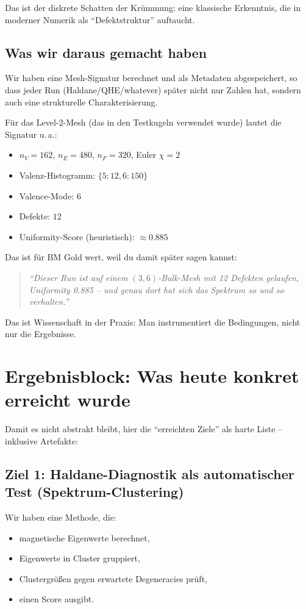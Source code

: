 \documentclass[11pt,a4paper]{article}
\begin{document}
Das ist der diskrete Schatten der Krümmung: eine klassische Erkenntnis, die in moderner Numerik als ``Defektstruktur'' auftaucht.

\subsection{Was wir daraus gemacht haben}

Wir haben eine Mesh-Signatur berechnet und als Metadaten abgespeichert, so dass jeder Run (Haldane/QHE/whatever) später nicht nur Zahlen hat, sondern auch eine strukturelle Charakterisierung.

Für das Level-2-Mesh (das in den Testkugeln verwendet wurde) lautet die Signatur u.\,a.:
\begin{itemize}[leftmargin=*,itemsep=0.5em]
    \item $n_V = 162$, $n_E = 480$, $n_F = 320$, Euler $\chi = 2$
    \item Valenz-Histogramm: $\{5: 12, 6: 150\}$
    \item Valence-Mode: $6$
    \item Defekte: $12$
    \item Uniformity-Score (heuristisch): $\approx 0.885$
\end{itemize}

Das ist für BM Gold wert, weil du damit später sagen kannst:

\begin{quote}
\emph{``Dieser Run ist auf einem $(3,6)$-Bulk-Mesh mit 12 Defekten gelaufen, Uniformity 0.885 -- und genau dort hat sich das Spektrum so und so verhalten.''}
\end{quote}

Das ist Wissenschaft in der Praxis: Man instrumentiert die Bedingungen, nicht nur die Ergebnisse.

\section{Ergebnisblock: Was heute konkret erreicht wurde}

Damit es nicht abstrakt bleibt, hier die ``erreichten Ziele'' als harte Liste -- inklusive Artefakte:

\subsection{Ziel 1: Haldane-Diagnostik als automatischer Test (Spektrum-Clustering)}

Wir haben eine Methode, die:
\begin{itemize}[leftmargin=*,itemsep=0.5em]
    \item magnetische Eigenwerte berechnet,
    \item Eigenwerte in Cluster gruppiert,
    \item Clustergrößen gegen erwartete Degeneracies prüft,
    \item einen Score ausgibt.
\end{itemize}
\end{document}
